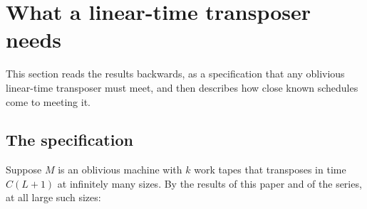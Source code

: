 \section{What a linear-time transposer needs}\label{sec:construction}

This section reads the results backwards, as a specification that any oblivious linear-time transposer must meet, and then
describes how close known schedules come to meeting it.

\subsection{The specification}

Suppose $M$ is an oblivious machine with $k$ work tapes that transposes in time $C(L+1)$ at infinitely many sizes. By the
results of this paper and of the series, at all large such sizes:
